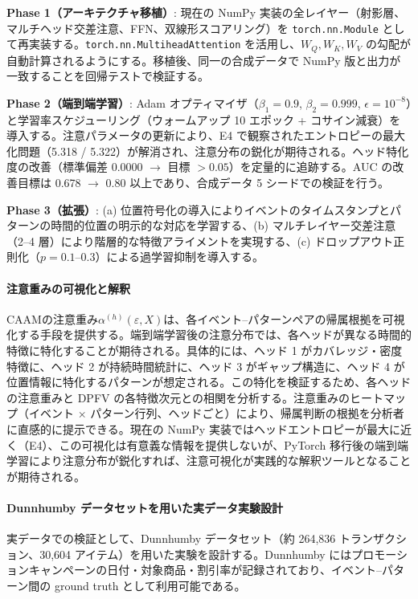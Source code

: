 \documentclass[sigconf,nonacm]{acmart}
\begin{document}
\textbf{Phase 1（アーキテクチャ移植）}: 現在の NumPy 実装の全レイヤー（射影層、マルチヘッド交差注意、FFN、双線形スコアリング）を \texttt{torch.nn.Module} として再実装する。\texttt{torch.nn.MultiheadAttention} を活用し、$W_Q, W_K, W_V$ の勾配が自動計算されるようにする。移植後、同一の合成データで NumPy 版と出力が一致することを回帰テストで検証する。

\textbf{Phase 2（端到端学習）}: Adam オプティマイザ（$\beta_1 = 0.9$, $\beta_2 = 0.999$, $\epsilon = 10^{-8}$）と学習率スケジューリング（ウォームアップ 10 エポック + コサイン減衰）を導入する。注意パラメータの更新により、E4 で観察されたエントロピーの最大化問題（5.318 / 5.322）が解消され、注意分布の鋭化が期待される。ヘッド特化度の改善（標準偏差 0.0000 $\to$ 目標 $> 0.05$）を定量的に追跡する。AUC の改善目標は 0.678 $\to$ 0.80 以上であり、合成データ 5 シードでの検証を行う。

\textbf{Phase 3（拡張）}: (a) 位置符号化の導入によりイベントのタイムスタンプとパターンの時間的位置の明示的な対応を学習する、(b) マルチレイヤー交差注意（2--4 層）により階層的な特徴アライメントを実現する、(c) ドロップアウト正則化（$p = 0.1$--$0.3$）による過学習抑制を導入する。

\paragraph{注意重みの可視化と解釈}
CAAMの注意重み$\alpha^{(h)}(\varepsilon, X)$は、各イベント--パターンペアの帰属根拠を可視化する手段を提供する。端到端学習後の注意分布では、各ヘッドが異なる時間的特徴に特化することが期待される。具体的には、ヘッド 1 がカバレッジ・密度特徴に、ヘッド 2 が持続時間統計に、ヘッド 3 がギャップ構造に、ヘッド 4 が位置情報に特化するパターンが想定される。この特化を検証するため、各ヘッドの注意重みと DPFV の各特徴次元との相関を分析する。注意重みのヒートマップ（イベント $\times$ パターン行列、ヘッドごと）により、帰属判断の根拠を分析者に直感的に提示できる。現在の NumPy 実装ではヘッドエントロピーが最大に近く（E4）、この可視化は有意義な情報を提供しないが、PyTorch 移行後の端到端学習により注意分布が鋭化すれば、注意可視化が実践的な解釈ツールとなることが期待される。

\paragraph{Dunnhumby データセットを用いた実データ実験設計}
実データでの検証として、Dunnhumby データセット（約 264,836 トランザクション、30,604 アイテム）を用いた実験を設計する。Dunnhumby にはプロモーションキャンペーンの日付・対象商品・割引率が記録されており、イベント--パターン間の ground truth として利用可能である。
\end{document}
